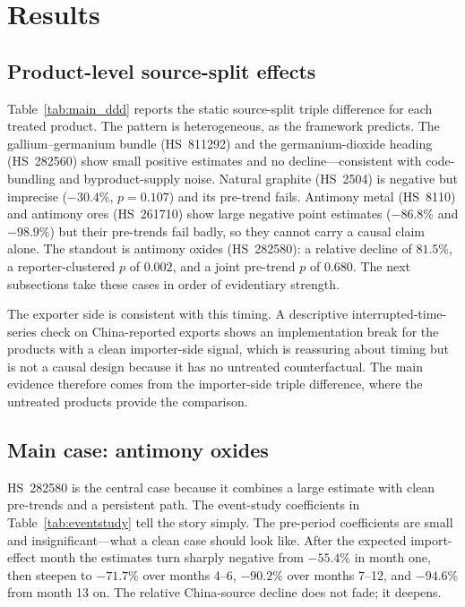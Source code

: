 \documentclass[12pt,a4paper]{article}
\begin{document}
\section{Results}\label{sec:results}

\subsection{Product-level source-split effects}\label{sec:productlevel}

Table~\ref{tab:main_ddd} reports the static source-split triple difference for
each treated product. The pattern is heterogeneous, as the framework predicts.
The gallium--germanium bundle (HS~811292) and the germanium-dioxide heading
(HS~282560) show small positive estimates and no decline---consistent with
code-bundling and byproduct-supply noise. Natural graphite (HS~2504) is negative
but imprecise ($-30.4\%$, $p=0.107$) and its pre-trend fails. Antimony metal
(HS~8110) and antimony ores (HS~261710) show large negative point estimates
($-86.8\%$ and $-98.9\%$) but their pre-trends fail badly, so they cannot carry
a causal claim alone. The standout is antimony oxides (HS~282580): a relative
decline of $81.5\%$, a reporter-clustered $p$ of $0.002$, and a joint pre-trend
$p$ of $0.680$. The next subsections take these cases in order of evidentiary
strength.

The exporter side is consistent with this timing. A descriptive
interrupted-time-series check on China-reported exports shows an implementation
break for the products with a clean importer-side signal, which is reassuring
about timing but is not a causal design because it has no untreated
counterfactual. The main evidence therefore comes from the importer-side triple
difference, where the untreated products provide the comparison.



\subsection{Main case: antimony oxides}\label{sec:antimonyoxide}

HS~282580 is the central case because it combines a large estimate with clean
pre-trends and a persistent path. The event-study coefficients in
Table~\ref{tab:eventstudy} tell the story simply. The pre-period coefficients are
small and insignificant---what a clean case should look like. After the expected
import-effect month the estimates turn sharply negative from $-55.4\%$ in month
one, then steepen to $-71.7\%$ over months 4--6, $-90.2\%$ over months 7--12, and
$-94.6\%$ from month 13 on. The relative China-source decline does not fade; it deepens.
\end{document}
